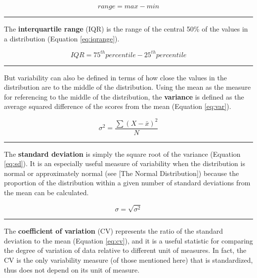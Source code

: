 \documentclass[
]{svmono}
\begin{document}
\begin{equation}
range=max-min
\label{eq:range}
\end{equation}

\begin{center}\rule{0.5\linewidth}{0.5pt}\end{center}

The \textbf{interquartile range} (IQR) is the range of the central 50\% of the
values in a distribution (Equation \eqref{eq:iqrange}).

\begin{equation}
IQR=75^{th} percentile - 25^{th} percentile
\label{eq:iqrange}
\end{equation}

\begin{center}\rule{0.5\linewidth}{0.5pt}\end{center}

But variability can also be defined in terms of how close the values in
the distribution are to the middle of the distribution. Using the mean
as the measure for referencing to the middle of the distribution, the
\textbf{variance} is defined as the average squared difference of the scores
from the mean (Equation \eqref{eq:var}).

\begin{equation}
\sigma^2=\frac{\sum{(X-\bar x)^2}}{N}
\label{eq:var}
\end{equation}

\begin{center}\rule{0.5\linewidth}{0.5pt}\end{center}

The \textbf{standard deviation} is simply the square root of the variance
(Equation \eqref{eq:sd}). It is an especially useful measure of variability when
the distribution is normal or approximately normal (see {[}The Normal
Distribution{]}) because the proportion of the distribution within a given
number of standard deviations from the mean can be calculated.

\begin{equation}
\sigma=\sqrt{\sigma^2}
\label{eq:sd}
\end{equation}

\begin{center}\rule{0.5\linewidth}{0.5pt}\end{center}

The \textbf{coefficient of variation} (CV) represents the ratio of the
standard deviation to the mean (Equation \eqref{eq:cv}), and it is a useful
statistic for comparing the degree of variation of data relative to
different unit of measures. In fact, the CV is the only variability
measure (of those mentioned here) that is standardized, thus does not
depend on its unit of measure.
\end{document}
